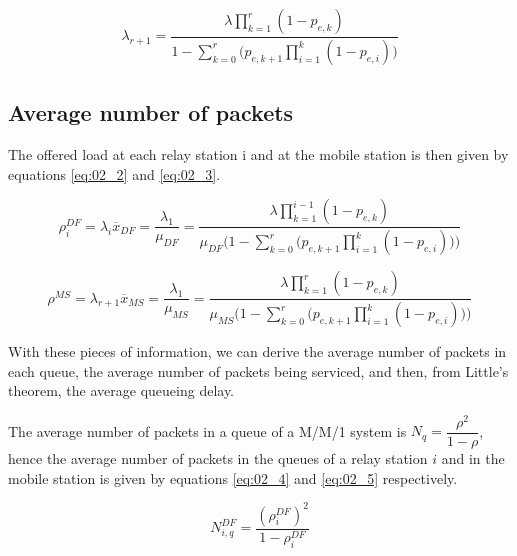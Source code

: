 \begin{align}
  \lambda_{r+1} = \dfrac{\lambda \prod\limits_{k=1}^{r} (1 - p_{e,k})}{1 - \sum\limits_{k=0}^r \Big(p_{e,k+1} \prod\limits_{i=1}^k (1 - p_{e,i})\Big)}
  \label{eq:02_lambda_r_plus_one}
\end{align}


\subsection{Average number of packets}

The offered load at each relay station i and at the mobile station is then given
by equations \ref{eq:02_2} and \ref{eq:02_3}.

\begin{equation}
  \rho_i^{DF} = \lambda_i \overline{x}_{DF} = \dfrac{\lambda_1}{\mu_{DF}} =
  \dfrac{\lambda \prod\limits_{k=1}^{i-1} (1 - p_{e,k})}{\mu_{DF}\Bigg(1 - \sum\limits_{k=0}^r \Big(p_{e,k+1} \prod\limits_{i=1}^k (1 - p_{e,i})\Big)\Bigg)}
  \label{eq:02_2}
\end{equation}

\begin{equation}
  \rho^{MS} = \lambda_{r+1} \overline{x}_{MS} = \dfrac{\lambda_1}{\mu_{MS}} =
  \dfrac{\lambda \prod\limits_{k=1}^{r} (1 - p_{e,k})}{\mu_{MS}\Bigg(1 - \sum\limits_{k=0}^r \Big(p_{e,k+1} \prod\limits_{i=1}^k (1 - p_{e,i})\Big)\Bigg)}
  \label{eq:02_3}
\end{equation}











With these pieces of information, we can derive the average number of packets
in each queue, the average number of packets being serviced, and then, from
Little's theorem, the average queueing delay.

The average number of packets in a queue of a M/M/1 system is
$N_q = \dfrac{\rho^2}{1-\rho}$, hence the average number of packets in the queues
of a relay station $i$ and in the mobile station is given by equations
\ref{eq:02_4} and \ref{eq:02_5} respectively.

\begin{equation}
  N_{i,q}^{DF} = \dfrac{(\rho_i^{DF})^2}{1 - \rho_i^{DF}}
  \label{eq:02_4}
\end{equation}


